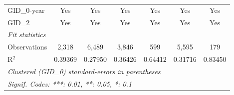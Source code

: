 \begin{table}[H]
\begin{tabular}{lcccccc}
      GID\_0-year                        & Yes      & Yes           & Yes            & Yes          & Yes      & Yes\\  
      GID\_2                             & Yes      & Yes           & Yes            & Yes          & Yes      & Yes\\  
      \midrule
      \emph{Fit statistics}\\
      Observations                       & 2,318    & 6,489         & 3,846          & 599          & 5,595    & 179\\  
      R$^2$                              & 0.39369  & 0.27950       & 0.36426        & 0.64412      & 0.31716  & 0.83450\\  
      \midrule \midrule
      \multicolumn{7}{l}{\emph{Clustered (GID\_0) standard-errors in parentheses}}\\
      \multicolumn{7}{l}{\emph{Signif. Codes: ***: 0.01, **: 0.05, *: 0.1}}\\
   \end{tabular}
\end{table}



